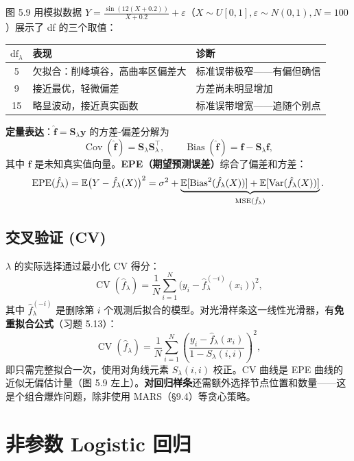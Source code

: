 图 5.9 用模拟数据 $Y = \frac{\sin(12(X+0.2))}{X+0.2} + \varepsilon$（$X \sim U[0,1], \varepsilon \sim N(0,1), N=100$）展示了 df 的三个取值：

\begin{center}
\small
\begin{tabular}{c|p{5.5cm}|p{4.5cm}}
\toprule
$\mathrm{df}_\lambda$ & 表现 & 诊断 \\
\midrule
5 & 欠拟合：削峰填谷，高曲率区偏差大 & 标准误带极窄——有偏但确信 \\
9 & 接近最优，轻微偏差 & 方差尚未明显增加 \\
15 & 略显波动，接近真实函数 & 标准误带增宽——追随个别点 \\
\bottomrule
\end{tabular}
\end{center}

\textbf{定量表达}：$\hat{\mathbf{f}} = \mathbf{S}_\lambda\mathbf{y}$ 的方差-偏差分解为
\[
\operatorname{Cov}(\hat{\mathbf{f}}) = \mathbf{S}_\lambda\mathbf{S}_\lambda^\top, \qquad
\operatorname{Bias}(\hat{\mathbf{f}}) = \mathbf{f} - \mathbf{S}_\lambda\mathbf{f},
\]
其中 $\mathbf{f}$ 是未知真实值向量。\textbf{EPE（期望预测误差）}综合了偏差和方差：
\[
\operatorname{EPE}(\hat{f}_\lambda) = \mathbb{E}\big(Y - \hat{f}_\lambda(X)\big)^2
= \sigma^2 + \underbrace{\mathbb{E}[\operatorname{Bias}^2(\hat{f}_\lambda(X))] + \mathbb{E}[\operatorname{Var}(\hat{f}_\lambda(X))]}_{\operatorname{MSE}(\hat{f}_\lambda)}.
\]

\subsection{交叉验证 (CV)}

$\lambda$ 的实际选择通过最小化 CV 得分：
\[
\operatorname{CV}(\hat{f}_\lambda) = \frac{1}{N} \sum_{i=1}^{N} \big( y_i - \hat{f}_\lambda^{(-i)}(x_i) \big)^2,
\]
其中 $\hat{f}_\lambda^{(-i)}$ 是删除第 $i$ 个观测后拟合的模型。对光滑样条这一线性光滑器，有\textbf{免重拟合公式}（习题 5.13）：
\[
\boxed{\operatorname{CV}(\hat{f}_\lambda) = \frac{1}{N} \sum_{i=1}^{N}
\left( \frac{y_i - \hat{f}_\lambda(x_i)}{1 - S_\lambda(i,i)} \right)^2,}
\]
即只需完整拟合一次，使用对角线元素 $S_\lambda(i,i)$ 校正。CV 曲线是 EPE 曲线的近似无偏估计量（图 5.9 左上）。\textbf{对回归样条}还需额外选择节点位置和数量——这是个组合爆炸问题，除非使用 MARS（§9.4）等贪心策略。


\section{非参数 Logistic 回归}

